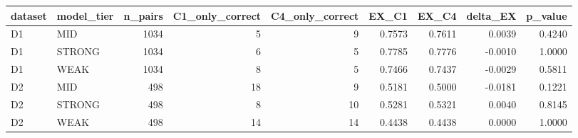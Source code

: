 \begin{tabular}{llrrrrrrr}
\toprule
dataset & model\_tier & n\_pairs & C1\_only\_correct & C4\_only\_correct & EX\_C1 & EX\_C4 & delta\_EX & p\_value \\
\midrule
D1 & MID & 1034 & 5 & 9 & 0.7573 & 0.7611 & 0.0039 & 0.4240 \\
D1 & STRONG & 1034 & 6 & 5 & 0.7785 & 0.7776 & -0.0010 & 1.0000 \\
D1 & WEAK & 1034 & 8 & 5 & 0.7466 & 0.7437 & -0.0029 & 0.5811 \\
D2 & MID & 498 & 18 & 9 & 0.5181 & 0.5000 & -0.0181 & 0.1221 \\
D2 & STRONG & 498 & 8 & 10 & 0.5281 & 0.5321 & 0.0040 & 0.8145 \\
D2 & WEAK & 498 & 14 & 14 & 0.4438 & 0.4438 & 0.0000 & 1.0000 \\
\bottomrule
\end{tabular}
